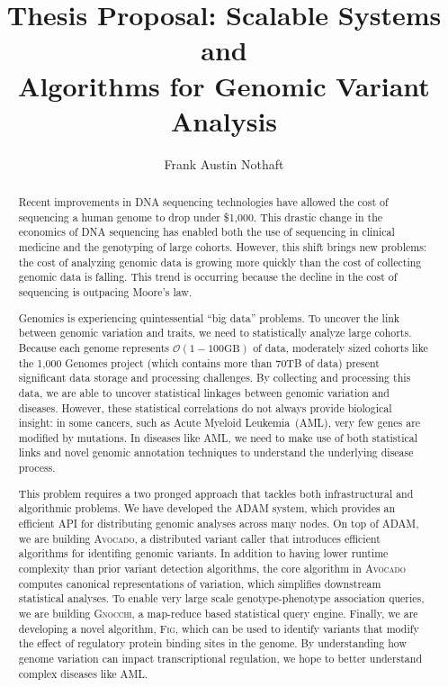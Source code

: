 \documentclass[11pt]{article} %
\begin{document}
\title{Thesis Proposal: Scalable Systems and \\ Algorithms for Genomic Variant Analysis}
\author{Frank Austin Nothaft} 
\date{}

\maketitle

\begin{abstract}

Recent improvements in DNA sequencing technologies have allowed the cost of sequencing a
human genome to drop under \$1,000. This drastic change in the economics of DNA sequencing
has enabled both the use of sequencing in clinical medicine and the genotyping of large
cohorts. However, this shift brings new problems: the cost of analyzing genomic data is
growing more quickly than the cost of collecting genomic data is falling. This trend is
occurring because the decline in the cost of sequencing is outpacing Moore's law.

Genomics is experiencing quintessential ``big data'' problems. To uncover the link between
genomic variation and traits, we need to statistically analyze large cohorts. Because each
genome represents $\mathcal{O}(1-100\text{GB})$ of data, moderately sized cohorts like the
1,000 Genomes project (which contains more than 70TB of data) present significant data
storage and processing challenges. By collecting and processing this data, we are able to
uncover statistical linkages between genomic variation and diseases. However, these statistical
correlations do not always provide biological insight: in some cancers, such as Acute
Myeloid Leukemia~(AML), very few genes are modified by mutations. In diseases like AML,
we need to make use of both statistical links and novel genomic annotation techniques to
understand the underlying disease process.

This problem requires a two pronged approach that tackles both infrastructural and
algorithmic problems. We have developed the \textsc{ADAM} system, which provides an efficient
API for distributing genomic analyses across many nodes. On top of \textsc{ADAM}, we are
building \textsc{Avocado}, a distributed variant caller that introduces efficient algorithms
for identifing genomic variants. In addition to having lower runtime complexity than prior
variant detection algorithms, the core algorithm in \textsc{Avocado} computes canonical
representations of variation, which simplifies downstream statistical analyses. To enable
very large scale genotype-phenotype association queries, we are building \textsc{Gnocchi},
a map-reduce based statistical query engine. Finally, we are developing a novel algorithm,
\textsc{Fig}, which can be used to identify variants that modify the effect of regulatory
protein binding sites in the genome. By understanding how genome variation can impact
transcriptional regulation, we hope to better understand complex diseases like AML.

\end{abstract}
\end{document}
